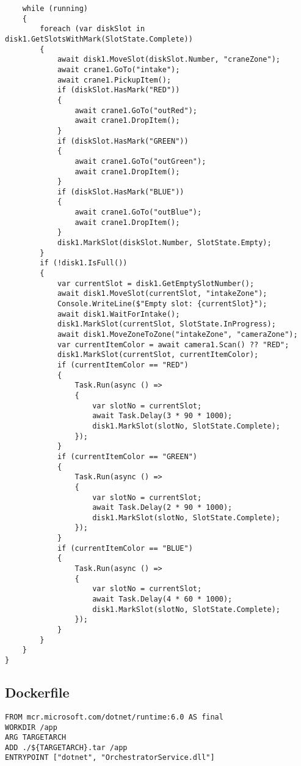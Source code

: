 \begin{verbatim}
    while (running)
    {
        foreach (var diskSlot in disk1.GetSlotsWithMark(SlotState.Complete))
        {
            await disk1.MoveSlot(diskSlot.Number, "craneZone");
            await crane1.GoTo("intake");
            await crane1.PickupItem();
            if (diskSlot.HasMark("RED"))
            {
                await crane1.GoTo("outRed");
                await crane1.DropItem();
            }
            if (diskSlot.HasMark("GREEN"))
            {
                await crane1.GoTo("outGreen");
                await crane1.DropItem();
            }
            if (diskSlot.HasMark("BLUE"))
            {
                await crane1.GoTo("outBlue");
                await crane1.DropItem();
            }
            disk1.MarkSlot(diskSlot.Number, SlotState.Empty);
        }
        if (!disk1.IsFull())
        {
            var currentSlot = disk1.GetEmptySlotNumber();
            await disk1.MoveSlot(currentSlot, "intakeZone");
            Console.WriteLine($"Empty slot: {currentSlot}");
            await disk1.WaitForIntake();
            disk1.MarkSlot(currentSlot, SlotState.InProgress);
            await disk1.MoveZoneToZone("intakeZone", "cameraZone");
            var currentItemColor = await camera1.Scan() ?? "RED";
            disk1.MarkSlot(currentSlot, currentItemColor);
            if (currentItemColor == "RED")
            {
                Task.Run(async () =>
                {
                    var slotNo = currentSlot;
                    await Task.Delay(3 * 90 * 1000);
                    disk1.MarkSlot(slotNo, SlotState.Complete);
                });
            }
            if (currentItemColor == "GREEN")
            {
                Task.Run(async () =>
                {
                    var slotNo = currentSlot;
                    await Task.Delay(2 * 90 * 1000);
                    disk1.MarkSlot(slotNo, SlotState.Complete);
                });
            }
            if (currentItemColor == "BLUE")
            {
                Task.Run(async () =>
                {
                    var slotNo = currentSlot;
                    await Task.Delay(4 * 60 * 1000);
                    disk1.MarkSlot(slotNo, SlotState.Complete);
                });
            }
        }
    }
}
\end{verbatim}

\subsection{Dockerfile}

\begin{verbatim}
FROM mcr.microsoft.com/dotnet/runtime:6.0 AS final
WORKDIR /app
ARG TARGETARCH
ADD ./${TARGETARCH}.tar /app
ENTRYPOINT ["dotnet", "OrchestratorService.dll"]
\end{verbatim}

